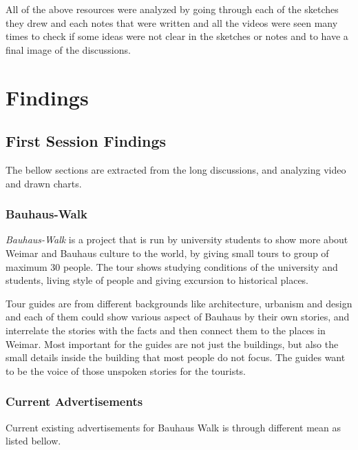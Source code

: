 All of the above resources were analyzed by going through each of the sketches they drew and each notes that were written and all the videos were seen many times to check if some ideas were not clear in the sketches or notes and to have a final image of the discussions.


\newpage
\section{Findings}

\subsection {First Session Findings}
The bellow sections are extracted from the long discussions, and analyzing video and drawn charts.


\subsubsection{Bauhaus-Walk}
\emph{Bauhaus-Walk} is a project that is run by university students to show more about Weimar and Bauhaus culture to the world, by giving small tours to group of maximum 30 people. The tour shows studying conditions of the university and students, living style of people and giving excursion to historical places.

Tour guides are from different backgrounds like architecture, urbanism and design and each of them could show various aspect of Bauhaus by their own stories, and interrelate the stories with the facts and then connect them to the places in Weimar. Most important for the guides are not just the buildings, but also the small details inside the building that most people do not focus. The guides want to be the voice of those unspoken stories for the tourists.

\subsubsection{Current Advertisements}
Current existing advertisements for Bauhaus Walk is through different mean as listed bellow.

